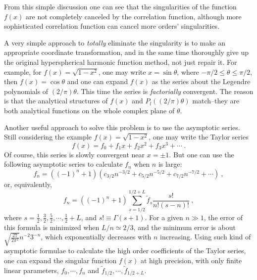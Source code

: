 From this simple discussion one can see that the singularities of the function
$f(x)$ are not completely canceled by the correlation function, although more
sophisticated correlation function can cancel more orders' singularities.

A very simple approach to \emph{totally} eliminate the singularity is
to make an appropriate coordinate transformation,
and in the same time thoroughly give up the original hyperspherical
harmonic function method, not just repair it.
For example, for $f(x)=\sqrt{1-x^2}$, one may write $x=\sin{\theta}$, where
$-\pi/2\le\theta\le\pi/2$, then $f(x)=\cos{\theta}$ and one can expand $f(x)$
as the series about the Legendre polynomials of $(2/\pi)\theta$.
This time the series is \emph{factorially} convergent. The reason is that
the analytical structures of $f(x)$ and $P_l((2/\pi)\theta)$ match--they are
both analytical functions on the whole complex plane of $\theta$.

Another useful approach to solve this problem is to use the asymptotic series.
Still considering the example $f(x)=\sqrt{1-x^2}$, one may write the Taylor
series
$$f(x)=f_0+f_{1}x+f_{2}x^{2}+f_{3}x^{3}+\cdots~.$$
Of course, this series is slowly convergent near $x=\pm 1$. But one can use the
following asymptotic series to calculate $f_n$ when $n$ is large:
$$f_n=((-1)^n+1)(c_{3/2}n^{-3/2}+c_{5/2}n^{-5/2}+c_{7/2}n^{-7/2}+\cdots)~,$$
or, equivalently,
$$f_n=((-1)^n+1)\sum_{s=1/2}^{1/2+L}\tilde{f}_{s}\frac{s!}{n!(s-n)!}~,$$
where $s=\frac{1}{2}, \frac{3}{2}, \frac{5}{2}, \cdots, \frac{1}{2}+L$,
and $s!\equiv\Gamma(s+1)$. For a given $n \gg 1$, the error of
this formula is minimized
when $L/n \simeq 2/3$, and the minimum error is about 
$\sqrt{\frac{27}{2\pi^2}} n^{-2} 3^{-n}$, which exponentially decreases with $n$
increasing. Using such kind of asymptotic formulae to calculate the high order
coefficients of the Taylor series, one can expand the singular function $f(x)$
at high precision, with only finite linear parameters, $f_0, \cdots, f_n$ and
$\tilde{f}_{1/2}, \cdots, \tilde{f}_{1/2+L}$.

